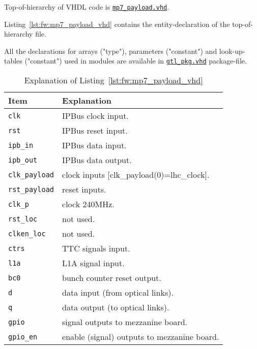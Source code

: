 Top-of-hierarchy of VHDL code is \href{\gitbranch/firmware/hdl/payload/mp7\_payload.vhd}{\texttt{\textquotesingle mp7\_payload.vhd\textquotesingle }}.

Listing~\ref{lst:fw:mp7_payload_vhd} contains the entity-declaration of the top-of-hierarchy file.



All the declarations for arrays ("type"), parameters ("constant") and look-up-tables ("constant") used in modules are available in \href{\gitbranch/firmware/hdl/packages/gtl\_pkg.vhd}{\texttt{\textquotesingle gtl\_pkg.vhd\textquotesingle }} package-file.

\medskip
\begin{table}
\footnotesize
\caption{Explanation of Listing~\ref{lst:fw:mp7_payload_vhd}}
\vspace{5mm}
\centering
\begin{tabular}{l p{}}
\toprule
{Item} & {Explanation}\\
\midrule
\verb|clk| & IPBus clock input.\\
\verb|rst| & IPBus reset input.\\
\verb|ipb_in| & IPBus data input.\\
\verb|ipb_out| & IPBus data output.\\
\verb|clk_payload| & clock inputs [clk\_payload(0)=lhc\_clock].\\
\verb|rst_payload| & reset inputs.\\
\verb|clk_p| & clock 240MHz.\\
\verb|rst_loc| & not used.\\
\verb|clken_loc| & not used.\\
\verb|ctrs| & TTC signals input.\\
\verb|l1a| & L1A signal input.\\
\verb|bc0| & bunch counter reset output.\\
\verb|d| & data input (from optical links).\\
\verb|q| & data output (to optical links).\\
\verb|gpio| & signal outputs to mezzanine board.\\
\verb|gpio_en| & enable (signal) outputs to mezzanine board.\\
\bottomrule
\end{tabular}
\label{tab:gtl:explanation_mp7_payload_vhd}
\end{table}

